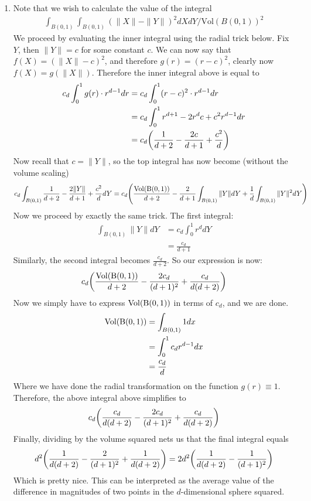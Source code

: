 \documentclass[12pt]{article}
\theoremstyle{definition}
\theoremstyle{remark}
\newcommand{\mg}[1]{\| #1 \|}
\begin{document}
\begin{enumerate}[leftmargin=\labelsep]
		\item Note that we wish to calculate the value of the integral 
		\begin{align*}
				\int_{B(0, 1)} \int_{B(0, 1)} (\mg{X}-\mg{Y})^2dXdY/\mathrm{Vol}(B(0, 1))^2
		\end{align*}
		We proceed by evaluating the inner integral using the radial trick below. Fix $Y$, then $\mg{Y} = c$ for some constant $c$. We can now say that $f(X) = (\mg{X}-c)^2$, and therefore $g(r) = (r-c)^2$, clearly now $f(X) = g(\mg{X})$. Therefore the inner integral above is equal to
		\begin{align*}
			c_d \int_0^1 g(r) \cdot r^{d-1}dr &= c_d \int_0^1 (r-c)^2 \cdot r^{d-1}dr \\
			&= c_d \int_0^1 r^{d+1}-2r^dc+c^2r^{d-1}dr \\
			&= c_d\qty(\frac1{d+2} - \frac{2c}{d+1} + \frac{c^2}{d})
		\end{align*}
		Now recall that $c = \mg{Y}$, so the top integral has now become (without the volume scaling)
		\begin{align*}
			c_d \int_{B(0, 1)} \frac1{d+2} - \frac{2\mg{Y}}{d+1} + \frac{c^2}{d}dY = c_d\qty(\frac{\rm{Vol}(B(0, 1))}{d+2}-\frac{2}{d+1}\int_{B(0, 1)} \mg{Y}dY + \frac{1}{d} \int_{B(0, 1)} \mg{Y}^2dY)
		\end{align*}
		Now we proceed by exactly the same trick. The first integral:
		\begin{align*}
			\int_{B(0, 1)} \mg{Y}dY  &= c_d \int_0^1 r^ddY \\
			&= \frac{c_d}{d+1}
		\end{align*}
		Similarly, the second integral becomes $\frac{c_d}{d+2}$. So our expression is now:
		\begin{align*}
			c_d\qty(\frac{\rm{Vol}(B(0, 1))}{d+2} - \frac{2c_d}{(d+1)^2}+\frac{c_d}{d(d+2)})
		\end{align*}
		Now we simply have to express $\rm{Vol}(B(0, 1))$ in terms of $c_d$, and we are done. 
		\begin{align*}
			\rm{Vol}(B(0, 1)) &= \int_{B(0, 1)} 1dx \\
			&= \int_0^1 c_dr^{d-1}dx \\
			&= \frac{c_d}{d}
		\end{align*}
		Where we have done the radial transformation on the function $g(r) \equiv 1$. Therefore, the above integral above simplifies to 
		\begin{align*}
			c_d\qty(\frac{c_d}{d(d+2)} - \frac{2c_d}{(d+1)^2}+\frac{c_d}{d(d+2)})
		\end{align*}
		Finally, dividing by the volume squared nets us that the final integral equals
		\begin{align*}
			d^2\qty(\frac{1}{d(d+2)} - \frac{2}{(d+1)^2}+\frac{1}{d(d+2)}) = 2d^2\qty(\frac{1}{d(d+2)}-\frac{1}{(d+1)^2})
		\end{align*} Which is pretty nice. This can be interpreted as the average value of the difference in magnitudes of two points in the $d$-dimensional sphere squared.
		

\end{enumerate}
\end{document}
